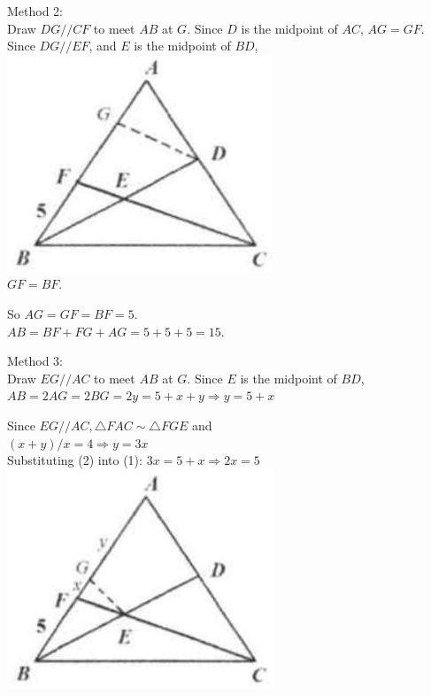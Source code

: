 \documentclass[10pt]{article}
\begin{document}
Method 2:\\
Draw \(D G / / C F\) to meet \(A B\) at \(G\). Since \(D\) is the midpoint of \(A C\), \(A G=G F\).\\
Since \(D G / / E F\), and \(E\) is the midpoint of \(B D\),\\
\includegraphics[max width=\textwidth, center]{2025_04_17_97bc1f7e44d93c271a88g-103(2)}\\
\(G F=B F\).

So \(A G=G F=B F=5\).\\
\(A B=B F+F G+A G=5+5+5=15\).

Method 3:\\
Draw \(E G / / A C\) to meet \(A B\) at \(G\). Since \(E\) is the midpoint of \(B D\),\\
\(A B=2 A G=2 B G=2 y=5+x+y \Rightarrow y=5+x\)

Since \(E G / / A C, \triangle F A C \sim \triangle F G E\) and\\
\((x+y) / x=4 \Rightarrow y=3 x\)\\
Substituting (2) into (1): \(3 x=5+x \Rightarrow 2 x=5\)\\
\includegraphics[max width=\textwidth, center]{2025_04_17_97bc1f7e44d93c271a88g-103(6)}
\end{document}
